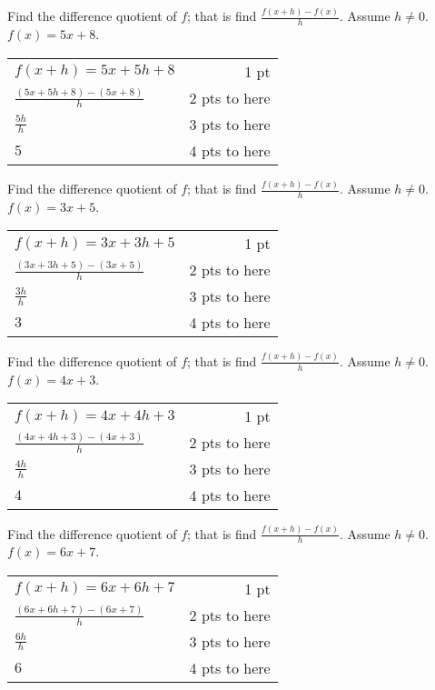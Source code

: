 {
	Find the difference quotient of $f$; that is find $\displaystyle\frac{f(x+h)-f(x)}{h}$. Assume $h\neq 0$. $f(x)=5x+8$.
}
{
	\begin{tabular} {l r}
	$f(x+h)=5x+5h+8$ & 1 pt \\
	$\frac{(5x+5h+8)-(5x+8)}{h}$ & 2 pts to here\\
	$\frac{5h}{h}$ & 3 pts to here\\
	$5$ & 4 pts to here
	\end{tabular}
}

{
	Find the difference quotient of $f$; that is find $\displaystyle\frac{f(x+h)-f(x)}{h}$. Assume $h\neq 0$. $f(x)=3x+5$.
}
{
	\begin{tabular}{l r}
	$f(x+h)=3x+3h+5$ & 1 pt \\
	$\frac{(3x+3h+5)-(3x+5)}{h}$ & 2 pts to here\\
	$\frac{3h}{h}$ & 3 pts to here\\
	$3$ & 4 pts to here
	\end{tabular}
}

{
	Find the difference quotient of $f$; that is find $\displaystyle\frac{f(x+h)-f(x)}{h}$. Assume $h\neq 0$. $f(x)=4x+3$.
}
{
	\begin{tabular}{l r}
	$f(x+h)=4x+4h+3$ & 1 pt \\
	$\frac{(4x+4h+3)-(4x+3)}{h}$ & 2 pts to here\\
	$\frac{4h}{h}$ & 3 pts to here\\
	$4$ & 4 pts to here
	\end{tabular}
}

{
	Find the difference quotient of $f$; that is find $\displaystyle\frac{f(x+h)-f(x)}{h}$. Assume $h\neq 0$. $f(x)=6x+7$.
}
{
	\begin{tabular}{l r}
	$f(x+h)=6x+6h+7$ & 1 pt \\
	$\frac{(6x+6h+7)-(6x+7)}{h}$ & 2 pts to here\\
	$\frac{6h}{h}$ & 3 pts to here\\
	$6$ & 4 pts to here
	\end{tabular}
}
